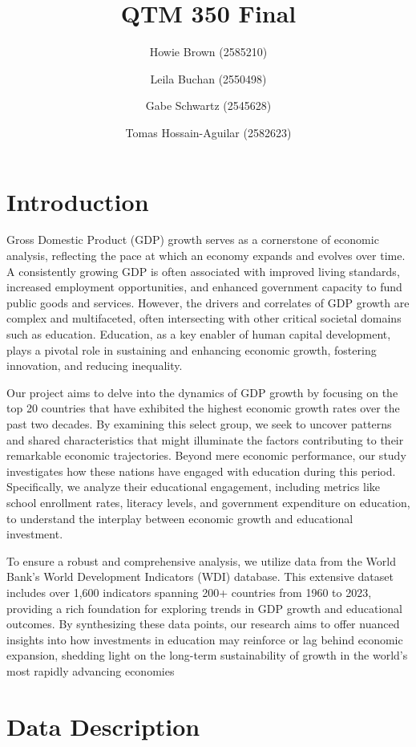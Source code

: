 \documentclass[
  letterpaper,
  DIV=11,
  numbers=noendperiod]{scrartcl}
\title{QTM 350 Final}
\author{Howie Brown (2585210) \and Leila Buchan (2550498) \and Gabe
Schwartz (2545628) \and Tomas Hossain-Aguilar (2582623)}
\date{}
\begin{document}
\maketitle


\section{Introduction}\label{introduction}

Gross Domestic Product (GDP) growth serves as a cornerstone of economic
analysis, reflecting the pace at which an economy expands and evolves
over time. A consistently growing GDP is often associated with improved
living standards, increased employment opportunities, and enhanced
government capacity to fund public goods and services. However, the
drivers and correlates of GDP growth are complex and multifaceted, often
intersecting with other critical societal domains such as education.
Education, as a key enabler of human capital development, plays a
pivotal role in sustaining and enhancing economic growth, fostering
innovation, and reducing inequality.

Our project aims to delve into the dynamics of GDP growth by focusing on
the top 20 countries that have exhibited the highest economic growth
rates over the past two decades. By examining this select group, we seek
to uncover patterns and shared characteristics that might illuminate the
factors contributing to their remarkable economic trajectories. Beyond
mere economic performance, our study investigates how these nations have
engaged with education during this period. Specifically, we analyze
their educational engagement, including metrics like school enrollment
rates, literacy levels, and government expenditure on education, to
understand the interplay between economic growth and educational
investment.

To ensure a robust and comprehensive analysis, we utilize data from the
World Bank's World Development Indicators (WDI) database. This extensive
dataset includes over 1,600 indicators spanning 200+ countries from 1960
to 2023, providing a rich foundation for exploring trends in GDP growth
and educational outcomes. By synthesizing these data points, our
research aims to offer nuanced insights into how investments in
education may reinforce or lag behind economic expansion, shedding light
on the long-term sustainability of growth in the world's most rapidly
advancing economies

\section{Data Description}\label{data-description}
\end{document}
